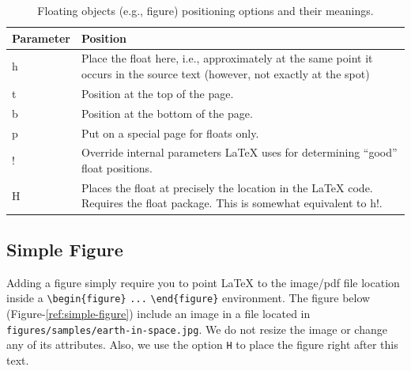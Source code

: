 \begin{table}[h!]
    \centering
    \begin{tabular}{p{}p{}}
        \hline\hline
        \textbf{Parameter} & \textbf{Position}                                                                                                            \\ \hline\hline
        h                  & Place the float here, i.e., approximately at the same point it occurs in the source text (however, not exactly at the spot)  \\ \hline
        t                  & Position at the top of the page.                                                                                             \\ \hline
        b                  & Position at the bottom of the page.                                                                                          \\ \hline
        p                  & Put on a special page for floats only.                                                                                       \\ \hline
        !                  & Override internal parameters {\LaTeX} uses for determining ``good'' float positions.                                            \\ \hline
        H                  & Places the float at precisely the location in the {\LaTeX} code. Requires the float package. This is somewhat equivalent to h!. \\ \hline\hline
    \end{tabular}
    \caption{Floating objects (e.g., figure) positioning options and their meanings.}
    \label{tab:position-options}
\end{table}


\subsection{Simple Figure}

Adding a figure simply require you to point {\LaTeX} to the image/pdf file location inside a \verb|\begin{figure}| \verb|...| \verb|\end{figure}| environment. The figure below (Figure-\ref{ref:simple-figure}) include an image in a file located in \verb|figures/samples/earth-in-space.jpg|. We do not resize the image or change any of its attributes. Also, we use the option \verb|H| to place the figure right after this text.


